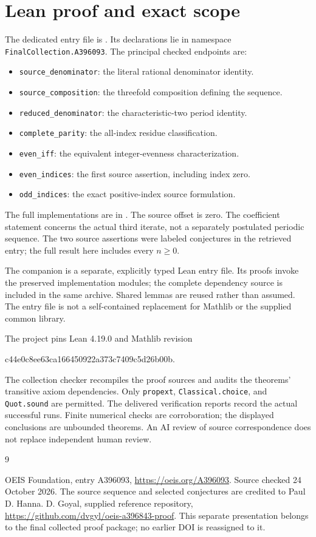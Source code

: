 \documentclass[11pt,a4paper]{article}
\theoremstyle{remark}
\begin{document}
\section{Lean proof and exact scope}
The dedicated entry file is . Its declarations lie in namespace \texttt{FinalCollection.A396093}. The principal checked endpoints are:
\begin{itemize}[nosep]
\item \texttt{source\_denominator}: the literal rational denominator identity.
\item \texttt{source\_composition}: the threefold composition defining the sequence.
\item \texttt{reduced\_denominator}: the characteristic-two period identity.
\item \texttt{complete\_parity}: the all-index residue classification.
\item \texttt{even\_iff}: the equivalent integer-evenness characterization.
\item \texttt{even\_indices}: the first source assertion, including index zero.
\item \texttt{odd\_indices}: the exact positive-index source formulation.
\end{itemize}
The full implementations are in .
The source offset is zero. The coefficient statement concerns the actual third iterate, not a separately postulated periodic sequence. The two source assertions were labeled conjectures in the retrieved entry; the full result here includes every $n\ge0$.

The companion is a separate, explicitly typed Lean entry file. Its proofs
invoke the preserved implementation modules; the complete dependency source
is included in the same archive. Shared lemmas are reused rather than
assumed. The entry file is not a self-contained replacement for Mathlib or
the supplied common library.

The project pins Lean 4.19.0 and Mathlib revision
\begin{center}\small\ttfamily
c44e0c8ee63ca166450922a373c7409c5d26b00b.
\end{center}
The collection checker recompiles the proof sources and audits the
theorems' transitive axiom dependencies. Only \texttt{propext},
\texttt{Classical.choice}, and \texttt{Quot.sound} are permitted.
The delivered verification reports record the actual successful runs.
Finite numerical checks are corroboration; the displayed conclusions are
unbounded theorems. An AI review of source correspondence does not replace
independent human review.
\begin{thebibliography}{9}
\raggedright
{} OEIS Foundation, entry A396093,
\url{https://oeis.org/A396093}. Source checked 24 October 2026.
The source sequence and selected conjectures are credited to Paul D. Hanna.
 D. Goyal, supplied reference repository,
\url{https://github.com/dvgyl/oeis-a396843-proof}.
This separate presentation belongs to the final collected proof package;
no earlier DOI is reassigned to it.
\end{thebibliography}
\end{document}
